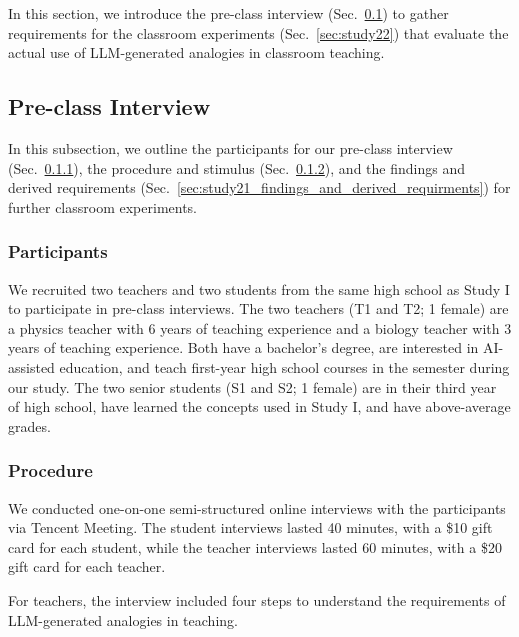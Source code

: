 In this section, we introduce the pre-class interview (Sec.~\ref{sec:study21}) to gather requirements for the classroom experiments (Sec.~\ref{sec:study22}) that evaluate the actual use of LLM-generated analogies in classroom teaching.



\subsection{Pre-class Interview}
\label{sec:study21}
In this subsection, we outline the participants for our pre-class interview (Sec.~\ref{sec:study21_participants}), the procedure and stimulus (Sec.~\ref{sec:study21_procedure_and_stimuls}), and the findings and derived requirements (Sec.~\ref{sec:study21_findings_and_derived_requirments}) for further classroom experiments. 
\subsubsection{Participants}
\label{sec:study21_participants}
We recruited two  teachers and two  students from the same high school as Study I to participate in pre-class interviews. 
The two teachers (T1 and T2; 1 female) are a physics teacher with 6 years of teaching experience and a biology teacher with 3 years of teaching experience. 
Both have a bachelor's degree, are interested in AI-assisted education, and teach first-year high school courses in the semester during our study.
The two senior students (S1 and S2; 1 female) are in their third year of high school, have learned the concepts used in Study I, and have above-average grades.


\subsubsection{Procedure}
\label{sec:study21_procedure_and_stimuls}
We conducted one-on-one semi-structured online interviews with the participants via Tencent Meeting.
The student interviews lasted 40 minutes, with a \$10 gift card for each student, while the teacher interviews lasted 60 minutes, with a \$20 gift card for each teacher.

For teachers, the interview included four steps to understand the requirements of LLM-generated analogies in teaching.

